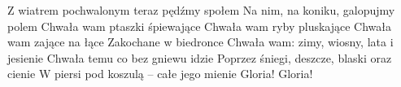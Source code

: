 \documentclass[../../../songbook.tex]{subfiles}
\begin{document}
Z wiatrem pochwalonym teraz pędźmy społem	 \newline
Na nim, na koniku, galopujmy polem			 \newline
Chwała wam ptaszki śpiewające				 \newline
Chwała wam ryby pluskające					 \newline
Chwała wam zające na łące					 \newline
Zakochane w biedronce						 \newline
Chwała wam: zimy, wiosny, lata i jesienie	 \newline
Chwała temu co bez gniewu idzie				 \newline
Poprzez śniegi, deszcze, blaski oraz cienie	 \newline
W piersi pod koszulą – całe jego mienie		 \newline
Gloria! Gloria!								 \newline
\end{document}
